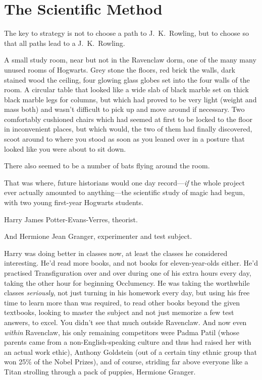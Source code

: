 \chapter{The Scientific Method}

\begin{chapterOpeningAuthorNote}
The key to strategy is not to choose a path to J.~K.~Rowling, but to choose so that all paths lead to a J.~K.~Rowling.
\end{chapterOpeningAuthorNote}

\lettrine{A}{} small study room, near but not in the Ravenclaw dorm, one of the many many unused rooms of Hogwarts. Grey stone the floors, red brick the walls, dark stained wood the ceiling, four glowing glass globes set into the four walls of the room. A circular table that looked like a wide slab of black marble set on thick black marble legs for columns, but which had proved to be very light (weight and mass both) and wasn't difficult to pick up and move around if necessary. Two comfortably cushioned chairs which had seemed at first to be locked to the floor in inconvenient places, but which would, the two of them had finally discovered, scoot around to where you stood as soon as you leaned over in a posture that looked like you were about to sit down.

There also seemed to be a number of bats flying around the room.

That was where, future historians would one day record—\emph{if} the whole project ever actually amounted to anything—the scientific study of magic had begun, with two young first-year Hogwarts students.

Harry James Potter-Evans-Verres, theorist.

And Hermione Jean Granger, experimenter and test subject.

Harry was doing better in classes now, at least the classes he considered interesting. He'd read more books, and not books for eleven-year-olds either. He'd practised Transfiguration over and over during one of his extra hours every day, taking the other hour for beginning Occlumency. He was taking the worthwhile classes \emph{seriously}, not just turning in his homework every day, but using his free time to learn more than was required, to read other books beyond the given textbooks, looking to master the subject and not just memorize a few test answers, to excel. You didn't see that much outside Ravenclaw. And now even \emph{within} Ravenclaw, his only remaining competitors were Padma Patil (whose parents came from a non-English-speaking culture and thus had raised her with an actual work ethic), Anthony Goldstein (out of a certain tiny ethnic group that won 25\% of the Nobel Prizes), and of course, striding far above everyone like a Titan strolling through a pack of puppies, Hermione Granger.

